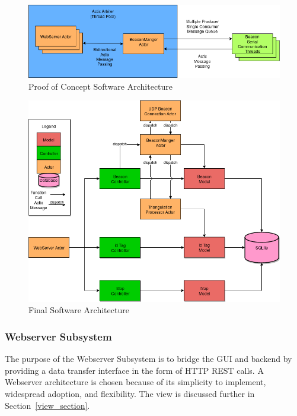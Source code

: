 \begin{figure}[H]
	\centering
    \includegraphics[scale=0.6]{images/poc_arch.png}
    \caption{Proof of Concept Software Architecture}
    \label{software_poc_arch}
\end{figure}

\begin{figure}[H]
	\centering
    \includegraphics[scale=0.6]{images/prototype_software_arch.png}
    \caption{Final Software Architecture}
    \label{software_final_arch}
\end{figure}

\bigskip
\subsubsection{Webserver Subsystem}
The purpose of the Webserver Subsystem is to bridge the GUI and backend by providing a data transfer interface in the form of HTTP REST calls.
A Webserver architecture is chosen because of its simplicity to implement, widespread adoption, and flexibility.
The view is discussed further in Section~\ref{view_section}.

